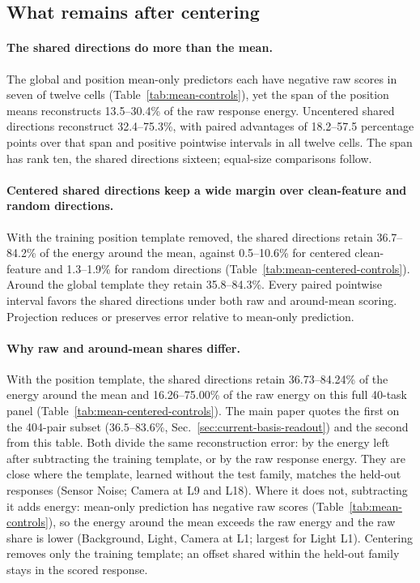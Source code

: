 \subsection{What remains after centering}
\paragraph{The shared directions do more than the mean.}
The global and position mean-only predictors each have negative raw scores in seven of twelve cells (Table~\ref{tab:mean-controls}), yet the span of the position means reconstructs 13.5--30.4\% of the raw response energy. Uncentered shared directions reconstruct 32.4--75.3\%, with paired advantages of 18.2--57.5 percentage points over that span and positive pointwise intervals in all twelve cells. The span has rank ten, the shared directions sixteen; equal-size comparisons follow.

\paragraph{Centered shared directions keep a wide margin over clean-feature and random directions.}
With the training position template removed, the shared directions retain 36.7--84.2\% of the energy around the mean, against 0.5--10.6\% for centered clean-feature and 1.3--1.9\% for random directions (Table~\ref{tab:mean-centered-controls}). Around the global template they retain 35.8--84.3\%. Every paired pointwise interval favors the shared directions under both raw and around-mean scoring. Projection reduces or preserves error relative to mean-only prediction.

\paragraph{Why raw and around-mean shares differ.}
With the position template, the shared directions retain 36.73--84.24\% of the energy around the mean and 16.26--75.00\% of the raw energy on this full 40-task panel (Table~\ref{tab:mean-centered-controls}). The main paper quotes the first on the 404-pair subset ($36.5$--$83.6\%$, Sec.~\ref{sec:current-basis-readout}) and the second from this table. Both divide the same reconstruction error: by the energy left after subtracting the training template, or by the raw response energy. They are close where the template, learned without the test family, matches the held-out responses (Sensor Noise; Camera at L9 and L18). Where it does not, subtracting it adds energy: mean-only prediction has negative raw scores (Table~\ref{tab:mean-controls}), so the energy around the mean exceeds the raw energy and the raw share is lower (Background, Light, Camera at L1; largest for Light L1). Centering removes only the training template; an offset shared within the held-out family stays in the scored response.

